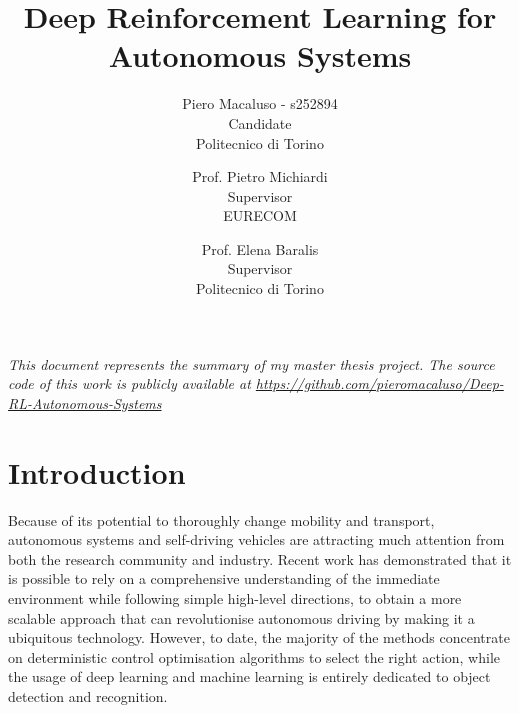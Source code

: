\documentclass[10pt,twocolumn,letterpaper]{article}
\begin{document}
\title{Deep Reinforcement Learning for Autonomous Systems}

\author{Piero Macaluso - s252894\\
Candidate\\
Politecnico di Torino\\
\and
Prof. Pietro Michiardi\\
Supervisor\\
EURECOM\\
\and
Prof. Elena Baralis\\
Supervisor\\
Politecnico di Torino\\
}

\maketitle


\textit{This document represents the summary of my master thesis project. The source code of this work is publicly available at \url{https://github.com/pieromacaluso/Deep-RL-Autonomous-Systems}}
\section{Introduction}

Because of its potential to thoroughly change mobility and transport, autonomous systems and self-driving vehicles are attracting much attention from both the research community and industry.
Recent work has demonstrated that it is possible to rely on a comprehensive understanding of the immediate environment while following simple high-level directions, to obtain a more scalable approach that can revolutionise autonomous driving by making it a ubiquitous technology.
However, to date, the majority of the methods concentrate on deterministic control optimisation algorithms to select the right action, while the usage of deep learning and machine learning is entirely dedicated to object detection and recognition.
\end{document}
